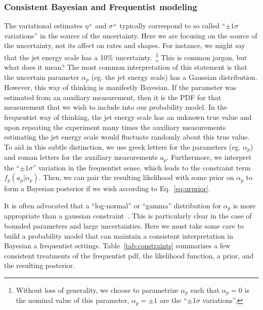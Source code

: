\subsubsection{Consistent Bayesian and Frequentist modeling}
\label{S:ConstraintExamples} 

The variational estimates $\eta^\pm$ and $\sigma^\pm$ typically correspond to so called ``$\pm 1\sigma$ variations'' in the source of the uncertainty.  Here we are focusing on the source of the uncertainty, not its affect on rates and shapes.  For instance, we might say that the jet energy scale has a 10\% uncertainty.~\footnote{Without loss of generality, we choose to parametrize $\alpha_p$ such that $\alpha_p=0$ is the nominal value of this parameter, $\alpha_p=\pm 1$ are the ``$\pm 1\sigma$ variations''.}  This is common jargon, but what does it mean?  The most common interpretation of this statement is that the uncertain parameter $\alpha_p$ (eg. the jet energy scale) has a Gaussian distribution.  However, this way of thinking is manifestly Bayesian.  If the parameter was estimated from an auxiliary measurement, then it is the PDF for that measurement that we wish to include into our probability model.  In the frequentist way of thinking, the jet energy scale has an unknown true value and upon repeating the experiment many times the auxiliary measurements estimating the jet energy scale would fluctuate randomly about this true value.  To aid in this subtle distinction, we use greek letters for the parameters (eg. $\alpha_p$) and roman letters for the auxiliary measurements $a_p$.  Furthermore, we interpret the ``$\pm 1\sigma$'' variation in the frequentist sense, which leads to the constraint term $f_p(a_p | \alpha_p)$.  Then, we can pair the resulting likelihood with some prior on $\alpha_p$ to form a Bayesian posterior if we wish according to Eq.~\ref{eq:urprior}.


It is often advocated that a ``log-normal'' or ``gamma'' distribution for $\alpha_p$ is more appropriate than a gaussian constraint~\cite{CousinsLogNormal}.  This is particularly clear in the case of bounded parameters and large uncertainties.    Here we must take some care to build a probability model that can maintain a consistent interpretation in Bayesian a frequentist settings.  Table~\ref{tab:constraints} summarizes a few consistent treatments of the frequentist pdf, the likelihood function, a prior, and the resulting posterior.


